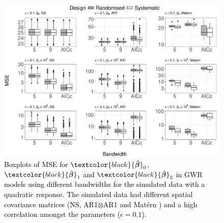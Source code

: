 \documentclass[a4paper]{article} 	%
\newcommand{\Matern}{Mat\'ern }
\newcommand{\zc}[1]{\textcolor{black}{#1}}
\begin{document}
\begin{figure}[!thp]
	\centering
	\includegraphics[width=\linewidth]{Col_QuaCombMSE_newpar_1K_eta01_V4.pdf}
	\caption{\zc{Boxplots of MSE for $\zc{\hat{\bm{\beta}}}_0$, $\zc{\hat{\bm{\beta}}}_1$ and $\zc{\hat{\bm{\beta}}}_2$ in GWR models using different bandwidths for the simulated data with a quadratic response. The simulated data had different spatial covariance matrices (NS, AR1$\otimes$AR1 and \Matern) and a high correlation amongst the parameters ($\epsilon=0.1$).}} \label{fig:QuadBetaMSEeta01}
\end{figure}

\end{document}

